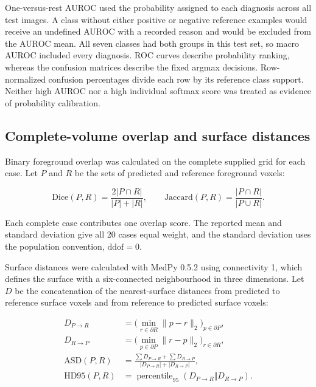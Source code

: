 \documentclass[11pt,a4paper]{article}
\begin{document}
One-versus-rest AUROC used the probability assigned to each diagnosis across all test images. A class without either positive or negative reference examples would receive an undefined AUROC with a recorded reason and would be excluded from the AUROC mean. All seven classes had both groups in this test set, so macro AUROC included every diagnosis. ROC curves describe probability ranking, whereas the confusion matrices describe the fixed argmax decisions. Row-normalized confusion percentages divide each row by its reference class support. Neither high AUROC nor a high individual softmax score was treated as evidence of probability calibration.



\subsection*{Complete-volume overlap and surface distances}

Binary foreground overlap was calculated on the complete supplied grid for each case. Let $P$ and $R$ be the sets of predicted and reference foreground voxels:




\begin{equation}
\label{eq:overlap-metrics}
\mathrm{Dice}(P,R)=\frac{2|P\cap R|}{|P|+|R|},\qquad \mathrm{Jaccard}(P,R)=\frac{|P\cap R|}{|P\cup R|}.
\end{equation}


Each complete case contributes one overlap score. The reported mean and standard deviation give all 20 cases equal weight, and the standard deviation uses the population convention, $\mathrm{ddof}=0$.



Surface distances were calculated with MedPy 0.5.2 using connectivity 1, which defines the surface with a six-connected neighbourhood in three dimensions. Let $D$ be the concatenation of the nearest-surface distances from predicted to reference surface voxels and from reference to predicted surface voxels:




\begin{equation}
\label{eq:surface-metrics}
\begin{aligned}D_{P\to R}&=\bigl(\min_{r\in\partial R}\|p-r\|_2\bigr)_{p\in\partial P},\\D_{R\to P}&=\bigl(\min_{p\in\partial P}\|r-p\|_2\bigr)_{r\in\partial R},\\\mathrm{ASD}(P,R)&=\frac{\sum D_{P\to R}+\sum D_{R\to P}}{|D_{P\to R}|+|D_{R\to P}|},\\\mathrm{HD95}(P,R)&=\operatorname{percentile}_{95}\!\left(D_{P\to R}\Vert D_{R\to P}\right).\end{aligned}
\end{equation}
\end{document}
